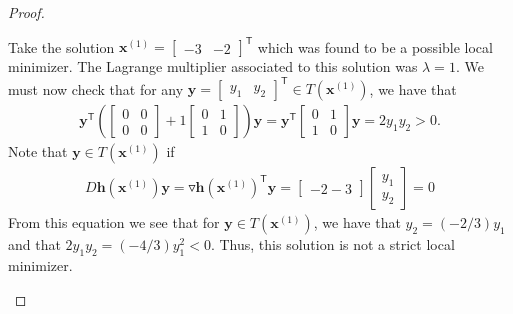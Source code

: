 \documentclass[12pt]{article}
\theoremstyle{definition}
\newcommand{\vc}[1]{\boldsymbol{#1}}
\newcommand{\tran}{\mathsf{T}}
\begin{document}
\begin{proof}
\begin{enumerate}
      Take the solution $\vc{x}^{(1)} = \begin{bmatrix}-3 & -2\end{bmatrix}^\tran$ which was found to be
      a possible local minimizer. The Lagrange multiplier associated to this solution was $\lambda=1$. We must
      now check that for any $\vc{y} = \begin{bmatrix}y_1 & y_2\end{bmatrix}^\tran \in T(\vc{x}^{(1)})$, we have that
      \begin{align*}
        \vc{y}^\tran \left(\begin{bmatrix}0 & 0 \\ 0 & 0\end{bmatrix} + 1 \begin{bmatrix}0 & 1 \\ 1 & 0\end{bmatrix}\right) \vc{y} =
         \vc{y}^\tran \begin{bmatrix}0 & 1 \\ 1 & 0\end{bmatrix} \vc{y} = 2y_1 y_2 > 0.
      \end{align*}
      Note that $\vc{y}\in T(\vc{x}^{(1)})$ if
      \begin{align*}
        D \vc{h}(\vc{x}^{(1)})\vc{y} = \triangledown \vc{h}(\vc{x}^{(1)})^\tran \vc{y} = \begin{bmatrix}-2 -3\end{bmatrix}\begin{bmatrix}y_1 \\ y_2\end{bmatrix} = 0
      \end{align*}
      From this equation we see that for $\vc{y}\in T(\vc{x}^{(1)})$, we have that $y_2 = (-2/3 )y_1$ and that $2y_1 y_2 = (-4/3)y_1^2< 0$.
      Thus, this solution is not a strict local minimizer.


\end{enumerate}
\end{proof}
\end{document}
